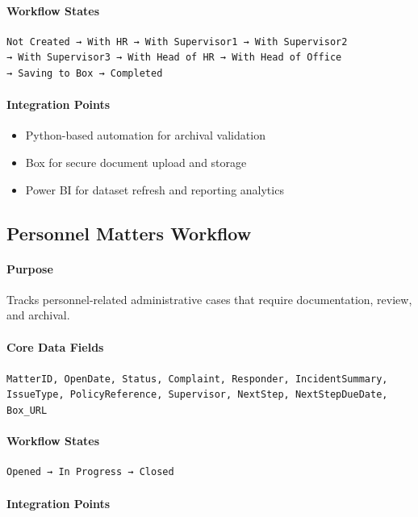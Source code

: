 \documentclass[12pt]{article}
\begin{document}
\paragraph{Workflow States}
\begin{verbatim}
Not Created → With HR → With Supervisor1 → With Supervisor2
→ With Supervisor3 → With Head of HR → With Head of Office
→ Saving to Box → Completed
\end{verbatim}

\paragraph{Integration Points}
\begin{itemize}
    \item Python-based automation for archival validation
    \item Box for secure document upload and storage
    \item Power BI for dataset refresh and reporting analytics
\end{itemize}

\subsection{Personnel Matters Workflow}

\paragraph{Purpose}
Tracks personnel-related administrative cases that require documentation, review, and archival.

\paragraph{Core Data Fields}
\texttt{MatterID, OpenDate, Status, Complaint, Responder, IncidentSummary, IssueType, PolicyReference, Supervisor, NextStep, NextStepDueDate, Box\_URL}

\paragraph{Workflow States}
\begin{verbatim}
Opened → In Progress → Closed
\end{verbatim}

\paragraph{Integration Points}
\end{document}
